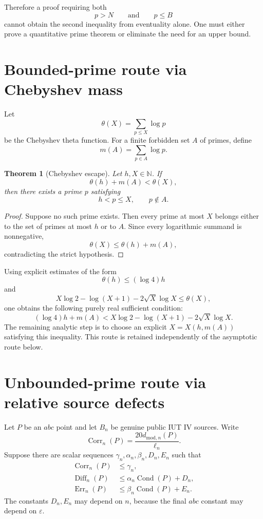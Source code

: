 \documentclass[11pt]{amsart}
\newtheorem{theorem}{Theorem}[section]
\theoremstyle{definition}
\theoremstyle{remark}
\newcommand{\N}{\mathbb N}
\newcommand{\eps}{\varepsilon}
\newcommand{\Corr}{\operatorname{Corr}}
\newcommand{\Diff}{\operatorname{Diff}}
\newcommand{\Err}{\operatorname{Err}}
\newcommand{\Cond}{\operatorname{Cond}}
\begin{document}
Therefore a proof requiring both
\[
 p>N
 \qquad\text{and}\qquad
 p\le B
\]
cannot obtain the second inequality from eventuality alone.  One must either
prove a quantitative prime theorem or eliminate the need for an upper bound.

\section{Bounded-prime route via Chebyshev mass}

Let
\[
 \theta(X)=\sum_{p\le X}\log p
\]
be the Chebyshev theta function.  For a finite forbidden set $A$ of primes,
define
\[
 m(A)=\sum_{p\in A}\log p.
\]

\begin{theorem}[Chebyshev escape]\label{thm:chebyshev-escape}
Let $h,X\in\N$.  If
\[
 \theta(h)+m(A)<\theta(X),
\]
then there exists a prime $p$ satisfying
\[
 h<p\le X,
 \qquad p\notin A.
\]
\end{theorem}

\begin{proof}
Suppose no such prime exists.  Then every prime at most $X$ belongs either to
the set of primes at most $h$ or to $A$.  Since every logarithmic summand is
nonnegative,
\[
 \theta(X)\le\theta(h)+m(A),
\]
contradicting the strict hypothesis.
\end{proof}

Using explicit estimates of the form
\[
 \theta(h)\le (\log4)h
\]
and
\[
 X\log2-\log(X+1)-2\sqrt X\log X\le\theta(X),
\]
one obtains the following purely real sufficient condition:
\[
 (\log4)h+m(A)
 <X\log2-\log(X+1)-2\sqrt X\log X.
\]
The remaining analytic step is to choose an explicit $X=X(h,m(A))$ satisfying
this inequality.  This route is retained independently of the asymptotic
route below.

\section{Unbounded-prime route via relative source defects}

Let $P$ be an $abc$ point and let $B_n$ be genuine public IUT IV sources.
Write
\[
 \Corr_n(P)=\frac{20d_{\mathrm{mod},n}(P)}{\ell_n}.
\]
Suppose there are scalar sequences
$\gamma_n,\alpha_n,\beta_n,D_n,E_n$ such that
\begin{align*}
 \Corr_n(P)&\le\gamma_n,\\
 \Diff_n(P)&\le\alpha_n\Cond(P)+D_n,\\
 \Err_n(P)&\le\beta_n\Cond(P)+E_n.
\end{align*}
The constants $D_n,E_n$ may depend on $n$, because the final $abc$ constant
may depend on $\eps$.
\end{document}
